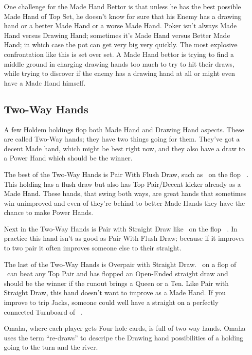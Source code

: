One challenge for the Made Hand Bettor is that unless he has the best
possible Made Hand of Top Set, he doesn't know for sure that his
Enemy has a drawing hand or a better Made Hand or a worse Made
Hand. Poker isn't always Made Hand versus Drawing Hand; sometimes it's
Made Hand versus Better Made Hand; in which case the pot can get very
big very quickly. The most explosive confrontation like this is set
over set. A Made Hand bettor is trying to find a middle ground in
charging drawing hands too much to try to hit their draws, while
trying to discover if the enemy has a drawing hand at all or might
even have a Made Hand himself.

\subsection{Two-Way Hands}

A few Holdem holdings flop both Made Hand and Drawing Hand aspects.
These are called Two-Way hands; they have two things going for them.
They've got a decent Made hand, which might be best right now, and
they also have a draw to a Power Hand which should be the winner.

The best of the Two-Way Hands is Pair With Flush Draw, such as
\Kd\tend\ on the flop \Kc\nined\eigd\ . This holding has a flush
draw but also has Top Pair/Decent kicker already as a Made Hand. These
hands, that swing both ways, are great hands that sometimes win
unimproved and even of they're behind to better Made Hands they
have the chance to make Power Hands.

Next in the Two-Way Hands is Pair with Straight Draw like
\tend\nined\ on the flop \tenc\eigh\sevs\ . In practice this hand
isn't as good as Pair With Flush Draw; because if it improves to two
pair it often improves someone else to their straight.

The last of the Two-Way Hands is Overpair with Straight
Draw. \Js\Jc\ on a flop of \tenc\nineh\eigs\ can beat any Top Pair
and has flopped an Open-Ended straight draw and should be the winner
if the runout brings a Queen or a Ten. Like Pair with Straight Draw,
this hand doesn't want to improve as a Made Hand. If you improve to
trip Jacks, someone could well have a straight on a perfectly
connected Turnboard of \tenc\nineh\eigs\Jh\ .

Omaha, where each player gets Four hole cards, is full of two-way
hands. Omaha uses the term ``re-draws'' to descripe tbe Drawing hand
possibilities of a holding going to the turn and the river.

